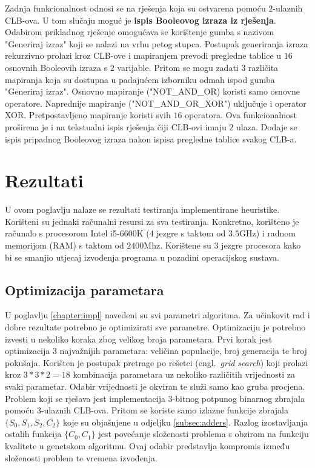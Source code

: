 \documentclass[times, utf8, diplomski]{fer}
\begin{document}
Zadnja funkcionalnost odnosi se na rješenja koja su ostvarena pomoću $2$-ulaznih CLB-ova. U tom slučaju moguć je \textbf{ispis Booleovog izraza iz rješenja}. Odabirom prikladnog rješenje omogućava se korištenje gumba s nazivom "Generiraj izraz" koji se nalazi na vrhu petog stupca. Postupak generiranja izraza rekurzivno prolazi kroz CLB-ove i mapiranjem prevodi pregledne tablice u $16$ osnovnih Booleovih izraza s $2$ varijable. Pritom se mogu zadati $3$ različita mapiranja koja su dostupna u padajućem izborniku odmah ispod gumba "Generiraj izraz". Osnovno mapiranje ("NOT\_AND\_OR) koristi samo osnovne operatore. Naprednije mapiranje ("NOT\_AND\_OR\_XOR") uključuje i operator XOR. Pretpostavljeno mapiranje koristi svih $16$ operatora. Ova funkcionalnost proširena je i na tekstualni ispis rješenja čiji CLB-ovi imaju $2$ ulaza. Dodaje se ispis pripadnog Booleovog izraza nakon ispisa pregledne tablice svakog CLB-a.


\chapter{Rezultati} \label{chapter:results}

U ovom poglavlju nalaze se rezultati testiranja implementirane heuristike. Korišteni su jednaki računalni resursi za sva testiranja. Konkretno, korišteno je računalo s procesorom Intel i5-6600K ($4$ jezgre s taktom od $3.5$GHz) i radnom memorijom (RAM) s taktom od $2400$Mhz. Korištene su $3$ jezgre procesora kako bi se smanjio utjecaj izvođenja programa u pozadini operacijskog sustava.


\section{Optimizacija parametara}

U poglavlju \ref{chapter:impl} navedeni su svi parametri algoritma. Za učinkovit rad i dobre rezultate potrebno je optimizirati sve parametre. Optimizaciju je potrebno izvesti u nekoliko koraka zbog velikog broja parametara. Prvi korak jest optimizacija $3$ najvažnijih parametara: veličina populacije, broj generacija te broj pokušaja. Korišten je postupak pretrage po rešetci (engl.~\textit{grid search}) koji prolazi kroz $3*3*2=18$ kombinacija parametara uz nekoliko različitih vrijednosti za svaki parametar. Odabir vrijednosti je okviran te služi samo kao gruba procjena. Problem koji se rješava jest implementacija $3$-bitnog potpunog binarnog zbrajala pomoću $3$-ulaznih CLB-ova. Pritom se koriste samo izlazne funkcije zbrajala $\{S_{0}, S_{1}, S_{2}, C_{2}\}$ koje su objašnjene u odjeljku \ref{subsec:adders}. Razlog izostavljanja ostalih funkcija $\{C_{0}, C_{1}\}$ jest povećanje složenosti problema s obzirom na funkciju kvalitete u genetskom algoritmu. Ovaj odabir predstavlja kompromis između složenosti problem te vremena izvođenja.
\end{document}
